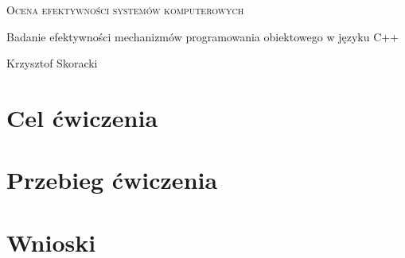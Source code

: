 \documentclass{article}
\begin{document}
\begin{center}
{\huge \textsc{Ocena efektywności systemów komputerowych}}

\vspace{0.8cm}
{\Large Badanie efektywności mechanizmów programowania obiektowego w języku C++}
\vspace{0.8cm}

Krzysztof Skoracki
\vspace{1cm}
\end{center}
\section{Cel ćwiczenia}

\section{Przebieg ćwiczenia}


\section{Wnioski}
\end{document}
